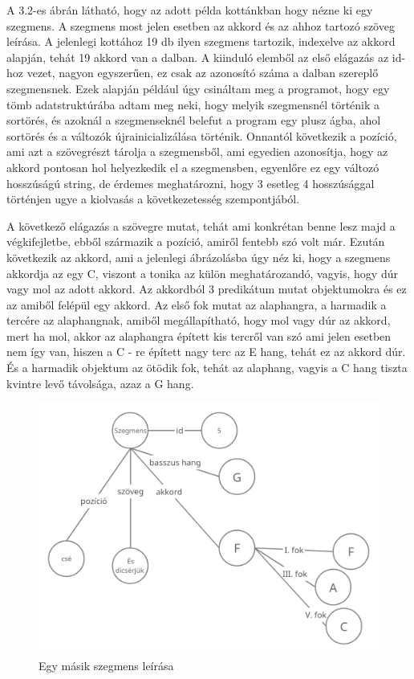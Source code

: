 A 3.2-es ábrán látható, hogy az adott példa kottánkban hogy nézne ki egy szegmens. A szegmens most jelen esetben az akkord és az ahhoz tartozó szöveg leírása. A jelenlegi kottához 19 db ilyen szegmens tartozik, indexelve az akkord alapján, tehát 19 akkord van a dalban. A kiinduló elemből az első elágazás az id-hoz vezet, nagyon egyszerűen, ez csak az azonosító száma a dalban szereplő szegmensnek. Ezek alapján például úgy csináltam meg a programot, hogy egy tömb adatstruktúrába adtam meg neki, hogy melyik szegmensnél történik a sortörés, és azoknál a szegmenseknél belefut a program egy plusz ágba, ahol sortörés és a változók újrainicializálása történik. Onnantól következik a pozíció, ami azt a szövegrészt tárolja a szegmensből, ami egyedien azonosítja, hogy az akkord pontosan hol helyezkedik el a szegmensben, egyenlőre ez egy változó hosszúságú string, de érdemes meghatározni, hogy 3 esetleg 4 hosszúsággal történjen ugye a kiolvasás a következetesség szempontjából. 
\par 
A következő elágazás a szövegre mutat, tehát ami konkrétan benne lesz majd a végkifejletbe, ebből származik a pozíció, amiről fentebb szó volt már. Ezután következik az akkord, ami a jelenlegi ábrázolásba úgy néz ki, hogy a szegmens akkordja az egy C, viszont a tonika az külön meghatározandó, vagyis, hogy dúr vagy mol az adott akkord. Az akkordból 3 predikátum mutat objektumokra és ez az amiből felépül egy akkord. Az első fok mutat az alaphangra, a harmadik a tercére az alaphangnak, amiből megállapítható, hogy mol vagy dúr az akkord, mert ha mol, akkor az alaphangra épített kis tercről van szó ami jelen esetben nem így van, hiszen a C - re épített nagy terc az E hang, tehát ez az akkord dúr. És a harmadik objektum az ötödik fok, tehát az alaphang, vagyis a C hang tiszta kvintre levő távolsága, azaz a G hang.\newpage

\begin{figure}[h]
	\includegraphics[scale=0.3]{images/rdf_graph_3.png}
	\caption{Egy másik szegmens leírása}
	\label{fig:graph3}
\end{figure}

